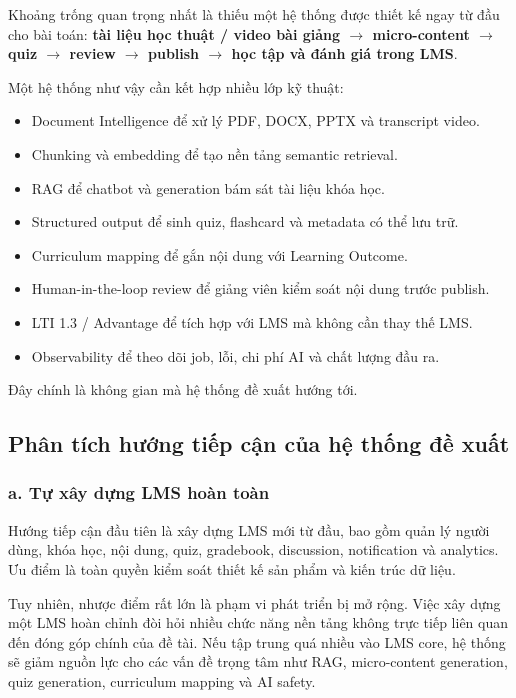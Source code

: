Khoảng trống quan trọng nhất là thiếu một hệ thống được thiết kế ngay từ đầu
cho bài toán: \textbf{tài liệu học thuật / video bài giảng $\rightarrow$
micro-content $\rightarrow$ quiz $\rightarrow$ review $\rightarrow$ publish
$\rightarrow$ học tập và đánh giá trong LMS}.

Một hệ thống như vậy cần kết hợp nhiều lớp kỹ thuật:

\begin{itemize}
    \item Document Intelligence để xử lý PDF, DOCX, PPTX và transcript video.
    \item Chunking và embedding để tạo nền tảng semantic retrieval.
    \item RAG để chatbot và generation bám sát tài liệu khóa học.
    \item Structured output để sinh quiz, flashcard và metadata có thể lưu trữ.
    \item Curriculum mapping để gắn nội dung với Learning Outcome.
    \item Human-in-the-loop review để giảng viên kiểm soát nội dung trước
          publish.
    \item LTI 1.3 / Advantage để tích hợp với LMS mà không cần thay thế LMS.
    \item Observability để theo dõi job, lỗi, chi phí AI và chất lượng đầu ra.
\end{itemize}

Đây chính là không gian mà hệ thống đề xuất hướng tới.

\subsection{Phân tích hướng tiếp cận của hệ thống đề xuất}

\subsubsection*{a. Tự xây dựng LMS hoàn toàn}

Hướng tiếp cận đầu tiên là xây dựng LMS mới từ đầu, bao gồm quản lý người dùng,
khóa học, nội dung, quiz, gradebook, discussion, notification và analytics. Ưu
điểm là toàn quyền kiểm soát thiết kế sản phẩm và kiến trúc dữ liệu.

Tuy nhiên, nhược điểm rất lớn là phạm vi phát triển bị mở rộng. Việc xây dựng
một LMS hoàn chỉnh đòi hỏi nhiều chức năng nền tảng không trực tiếp liên quan
đến đóng góp chính của đề tài. Nếu tập trung quá nhiều vào LMS core, hệ thống
sẽ giảm nguồn lực cho các vấn đề trọng tâm như RAG, micro-content generation,
quiz generation, curriculum mapping và AI safety.

